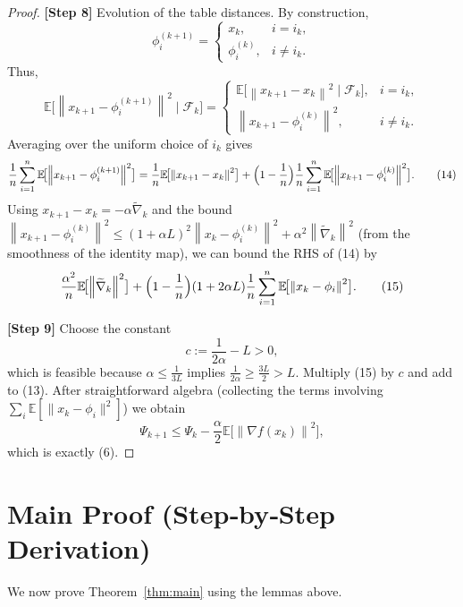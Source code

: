 \documentclass{article}
\newcommand{\E}{\mathbb{E}}
\newcommand{\grad}{\nabla}
\newcommand{\norm}[1]{\left\|#1\right\|}
\begin{document}
\begin{proof}
\textbf{[Step 8]} Evolution of the table distances. By construction,
\[
\phi_i^{(k+1)}=
\begin{cases}
x_k, & i=i_k,\\
\phi_i^{(k)}, & i\neq i_k .
\end{cases}
\]
Thus,
\[
\E\!\bigl[\norm{x_{k+1}-\phi_i^{(k+1)}}^{2}\mid\mathcal{F}_k\bigr]
=
\begin{cases}
\displaystyle\E\!\bigl[\norm{x_{k+1}-x_k}^{2}\mid\mathcal{F}_k\bigr],
 & i=i_k,\\[6pt]
\displaystyle\norm{x_{k+1}-\phi_i^{(k)}}^{2}, & i\neq i_k .
\end{cases}
\]
Averaging over the uniform choice of $i_k$ gives
\[
\frac{1}{n}\sum_{i=1}^{n}\E\!\bigl[\norm{x_{k+1}-\phi_i^{(k+1)}}^{2}\bigr]
=
\frac{1}{n}\E\!\bigl[\norm{x_{k+1}-x_k}^{2}\bigr]
+\Bigl(1-\frac{1}{n}\Bigr)\frac{1}{n}\sum_{i=1}^{n}\E\!\bigl[\norm{x_{k+1}-\phi_i^{(k)}}^{2}\bigr].
\tag{14}
\]
Using $x_{k+1}-x_k=-\alpha\widetilde{\nabla}_k$ and the bound $\norm{x_{k+1}-\phi_i^{(k)}}^{2}
\le (1+\alpha L)^{2}\norm{x_k-\phi_i^{(k)}}^{2}+ \alpha^{2}\norm{\widetilde{\nabla}_k}^{2}$ (from the smoothness of the identity map), we can bound the RHS of (14) by
\[
\frac{\alpha^{2}}{n}\E\!\bigl[\norm{\widetilde{\nabla}_k}^{2}\bigr]
+\Bigl(1-\frac{1}{n}\Bigr)(1+2\alpha L)\frac{1}{n}\sum_{i=1}^{n}\E\!\bigl[\norm{x_k-\phi_i}^{2}\bigr].
\tag{15}
\]

\textbf{[Step 9]} Choose the constant
\[
c:=\frac{1}{2\alpha}-L>0,
\]
which is feasible because $\alpha\le\frac{1}{3L}$ implies $\frac{1}{2\alpha}\ge \frac{3L}{2}>L$.
Multiply (15) by $c$ and add to (13). After straightforward algebra (collecting the terms involving $\sum_i\E[\|x_k-\phi_i\|^2]$) we obtain
\[
\Psi_{k+1}\le \Psi_{k}-\frac{\alpha}{2}\E\!\bigl[\norm{\grad f(x_k)}^{2}\bigr],
\]
which is exactly (6). \qedhere
\end{proof}

\section*{Main Proof (Step‑by‑Step Derivation)}
We now prove Theorem~\ref{thm:main} using the lemmas above.
\end{document}
